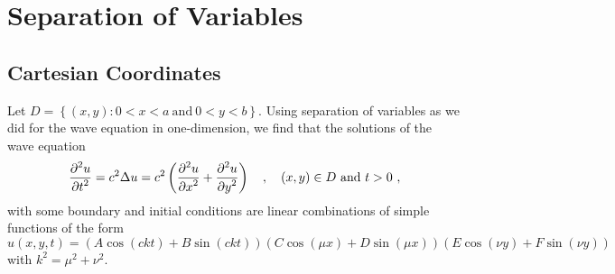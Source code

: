 \section{Separation of Variables}

\subsection{Cartesian Coordinates}

Let $D = \left\{ (x,y) : 0 < x < a \ \text{and} \ 0 < y < b \right\}$.
Using separation of variables as we did for the wave equation in
one-dimension, we find that the solutions of the wave
equation
\[
\frac{\displaystyle \partial^{2}{u}} {\displaystyle \partial t^{2}} = c^2 \Delta u = c^2 \left(\frac{\displaystyle \partial^{2}{u}} {\displaystyle \partial x^{2}} +
\frac{\displaystyle \partial^{2}{u}} {\displaystyle \partial y^{2}}\right) \quad , \quad (x,y) \in D\ \text{and} \ t > 0\ ,
\]
with some boundary and initial conditions are linear combinations of
simple functions of the form
\[
u(x,y,t) = (A \cos (ckt) + B \sin (ckt))(C \cos (\mu x) +
D \sin (\mu x))(E \cos (\nu y) + F \sin (\nu y))
\]
with $k^2 = \mu^2 + \nu^2$.

